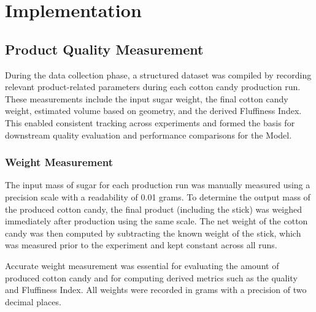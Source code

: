 \chapter{Implementation}
\label{sec:implementation}

\section{Product Quality Measurement}

During the data collection phase, a structured dataset was compiled by recording relevant product-related parameters during each cotton candy production run. These measurements include the input sugar weight, the final cotton candy weight, estimated volume based on geometry, and the derived Fluffiness Index. This enabled consistent tracking across experiments and formed the basis for downstream quality evaluation and performance comparisons for the Model.

\subsection{Weight Measurement}


The input mass of sugar for each production run was manually measured using a precision scale with a readability of 0.01 grams. To determine the output mass of the produced cotton candy, the final product (including the stick) was weighed immediately after production using the same scale. The net weight of the cotton candy was then computed by subtracting the known weight of the stick, which was measured prior to the experiment and kept constant across all runs.

Accurate weight measurement was essential for evaluating the amount of produced cotton candy and for computing derived metrics such as the quality and Fluffiness Index. All weights were recorded in grams with a precision of two decimal places.



